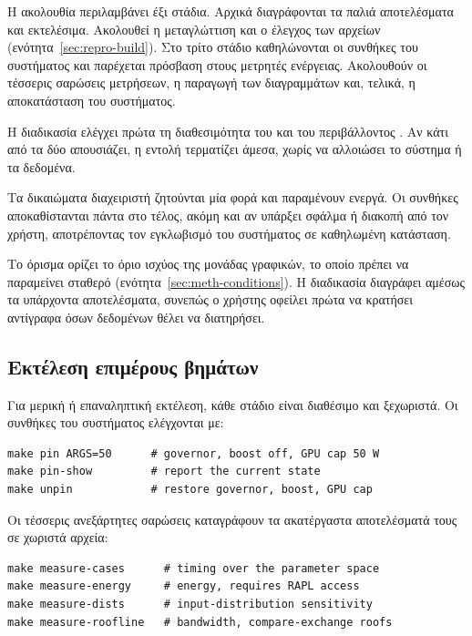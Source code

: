 Η ακολουθία περιλαμβάνει έξι στάδια. Αρχικά διαγράφονται τα παλιά αποτελέσματα
και εκτελέσιμα. Ακολουθεί η μεταγλώττιση και ο έλεγχος των αρχείων
(ενότητα~\ref{sec:repro-build}). Στο τρίτο στάδιο καθηλώνονται οι συνθήκες του
συστήματος και παρέχεται πρόσβαση στους μετρητές ενέργειας. Ακολουθούν οι
τέσσερις σαρώσεις μετρήσεων, η παραγωγή των διαγραμμάτων και, τελικά, η
αποκατάσταση του συστήματος.

Η διαδικασία ελέγχει πρώτα τη διαθεσιμότητα του  και του περιβάλλοντος
. Αν κάτι από τα δύο απουσιάζει, η εντολή τερματίζει άμεσα, χωρίς
να αλλοιώσει το σύστημα ή τα δεδομένα.

Τα δικαιώματα διαχειριστή ζητούνται μία φορά και παραμένουν ενεργά. Οι συνθήκες
αποκαθίστανται πάντα στο τέλος, ακόμη και αν υπάρξει σφάλμα ή διακοπή από τον
χρήστη, αποτρέποντας τον εγκλωβισμό του συστήματος σε καθηλωμένη κατάσταση.

Το όρισμα  ορίζει το όριο ισχύος της μονάδας γραφικών, το οποίο
πρέπει να παραμείνει σταθερό (ενότητα~\ref{sec:meth-conditions}). Η διαδικασία
διαγράφει αμέσως τα υπάρχοντα αποτελέσματα, συνεπώς ο χρήστης οφείλει πρώτα να
κρατήσει αντίγραφα όσων δεδομένων θέλει να διατηρήσει.

\subsection{Εκτέλεση επιμέρους βημάτων}
\label{sec:repro-steps}

Για μερική ή επαναληπτική εκτέλεση, κάθε στάδιο είναι διαθέσιμο και ξεχωριστά.
Οι συνθήκες του συστήματος ελέγχονται με:

\begin{verbatim}
make pin ARGS=50      # governor, boost off, GPU cap 50 W
make pin-show         # report the current state
make unpin            # restore governor, boost, GPU cap
\end{verbatim}

Οι τέσσερις ανεξάρτητες σαρώσεις καταγράφουν τα ακατέργαστα αποτελέσματά τους
σε χωριστά αρχεία:

\begin{verbatim}
make measure-cases      # timing over the parameter space
make measure-energy     # energy, requires RAPL access
make measure-dists      # input-distribution sensitivity
make measure-roofline   # bandwidth, compare-exchange roofs
\end{verbatim}

